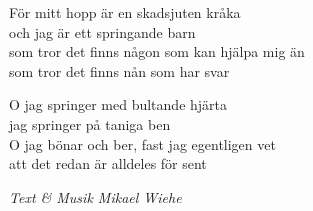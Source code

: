 \vspace{10pt}
För mitt hopp är en skadsjuten kråka\\
och jag är ett springande barn\\
som tror det finns någon som kan hjälpa mig än\\
som tror det finns nån som har svar\par
\vspace{10pt}
O jag springer med bultande hjärta\\
jag springer på taniga ben\\
O jag bönar och ber, fast jag egentligen vet\\
att det redan är alldeles för sent
\par
\vspace{10pt}
{\footnotesize\textit{Text \& Musik Mikael Wiehe}}
